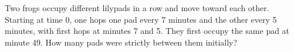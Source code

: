 Two frogs occupy different lilypads in a row and move toward each other. Starting at time 0, one hops one pad every 7 minutes and the other every 5 minutes, with first hops at minutes 7 and 5. They first occupy the same pad at minute 49. How many pads were strictly between them initially?
